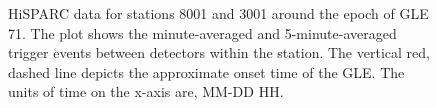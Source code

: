 \begin{figure}[ht!]
	\centering
	
	\caption{HiSPARC data for stations 8001 and 3001 around the epoch of GLE 71. The plot shows the minute-averaged and 5-minute-averaged trigger events between detectors within the station. The vertical red, dashed line depicts the approximate onset time of the GLE. The units of time on the x-axis are, MM-DD HH.}
	\label{fig:GLE_71}
\end{figure}

